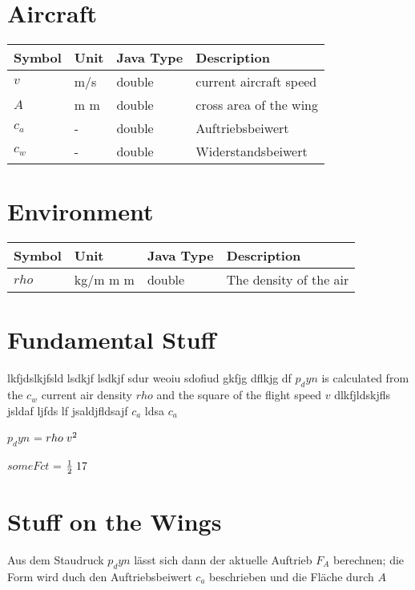 \documentclass{article}
\begin{document}
\section{Aircraft}
\begin{tabular}{l l l | l}
Symbol & Unit & Java Type & Description \\ \hline
$v$  &  m/s  &  double  &  current aircraft speed \\ 
$A$  &  m m  &  double  &  cross area of the wing \\ 
$c_a$  &  -  &  double  &  Auftriebsbeiwert \\ 
$c_w$  &  -  &  double  &  Widerstandsbeiwert \\ 
\end{tabular}
\section{Environment}
\begin{tabular}{l l l | l}
Symbol & Unit & Java Type & Description \\ \hline
$rho$  &  kg/m m m  &  double  &  The density of the air \\ 
\end{tabular}
\section{Fundamental Stuff}
lkfjdslkjfsld lsdkjf lsdkjf sdur weoiu sdofiud gkfjg dflkjg df $p_dyn$ is calculated from the $c_w$ current air density $rho$ and the square of the flight speed $v$ dlkfjldskjfls jsldaf ljfds lf jsaldjfldsajf $c_a$ ldsa $c_a$ 


\vspace{3 mm}
$p_dyn$ \hspace{1 mm} = \hspace{1 mm} $rho\hspace{1 mm}v^{2}$ 


\vspace{3 mm}


\vspace{3 mm}
$someFct$ \hspace{1 mm} = \hspace{1 mm} $\frac{1}{2}\hspace{1 mm}17$ 


\vspace{3 mm}
\section{Stuff on the Wings}
Aus dem Staudruck $p_dyn$ lässt sich dann der aktuelle Auftrieb $F_A$ berechnen; die Form wird duch den Auftriebsbeiwert $c_a$ beschrieben  und die Fläche durch  $A$ 
\end{document}
